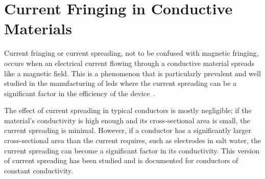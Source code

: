 
\section{Current Fringing in Conductive Materials}

Current fringing or current spreading, not to be confused with magnetic fringing, occurs when an electrical current flowing through a conductive material spreads like a magnetic field.
This is a phenomenon that is particularly prevalent and well studied in the manufacturing of \glspl{led} where the current spreading can be a significant factor in the efficiency of the device~\cite{solomentsev_LED_current_spreading_2022, hwang_LED_current_spreading_2008, jeon_LED_current_spreading_2001}.

The effect of current spreading in typical conductors is mostly negligible; if the material's conductivity is high enough and its cross-sectional area is small, the current spreading is minimal.
However, if a conductor has a significantly larger cross-sectional area than the current requires, such as electrodes in salt water, the current spreading can become a significant factor in its conductivity.
This version of current spreading has been studied and is documented for conductors of constant conductivity.~\cite{jason_current_spreading_long_objects_2008}


